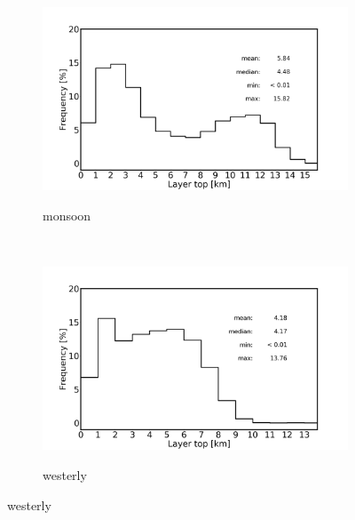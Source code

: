 \documentclass[alpha-refs]{wiley-article}
\begin{document}
\begin{figure}[!htbp]
   \begin{subfigure}[b]{0.5\textwidth}
       \centering
        \caption{monsoon}       
        \includegraphics[width=\textwidth]{layertop_pdf_monsoondomain_monsoonseason.png}
   \label{fig:pdf3}
    \end{subfigure}%
    ~ 
    \begin{subfigure}[b]{.5\textwidth}
        \centering
\caption{westerly}        
        \includegraphics[width=\textwidth]{layertop_pdf_westerlydomain_westerlyseason.png}
   \label{fig:pdf4}
    \end{subfigure}


\end{figure}
\end{document}
